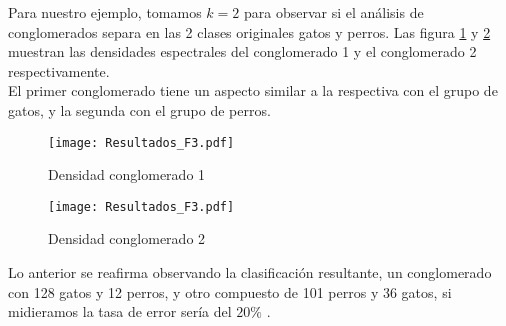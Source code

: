 \documentclass[twocolumn,10pt]{asme2ej}
\begin{document}
Para nuestro ejemplo, tomamos $k=2$ para observar si el an\'alisis de conglomerados separa en las 2 clases originales gatos y perros. Las figura \ref{plot:espec_k1} y \ref{plot:espec_k2} muestran las densidades espectrales del conglomerado 1 y el conglomerado 2 respectivamente. \\

El primer conglomerado tiene un aspecto similar a la respectiva con el grupo de gatos, y la segunda con el grupo de perros. \\

\begin{figure}[h]
  \centering
    \texttt{[image: Resultados\_F3.pdf]}
  \caption{Densidad conglomerado 1}
  \label{plot:espec_k1}
\end{figure}
\begin{figure}[h]
  \centering
    \texttt{[image: Resultados\_F3.pdf]}
  \caption{Densidad conglomerado 2}
  \label{plot:espec_k2}
\end{figure}
Lo anterior se reafirma observando la clasificaci\'on resultante, un conglomerado con 128 gatos y 12 perros, y otro compuesto de 101 perros y 36 gatos, si midieramos la tasa de error ser\'ia del $20\%$ .







\end{document}
